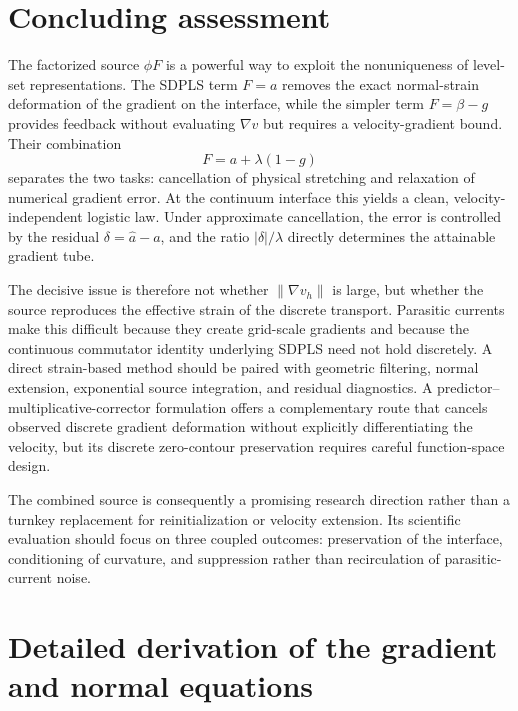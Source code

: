 \documentclass[11pt,a4paper]{article}
\theoremstyle{definition}
\theoremstyle{remark}
\newcommand{\norm}[1]{\left\lVert #1\right\rVert}
\newcommand{\abs}[1]{\left\lvert #1\right\rvert}
\begin{document}
\section{Concluding assessment}

The factorized source $\phi F$ is a powerful way to exploit the nonuniqueness of level-set representations. The SDPLS term $F=a$ removes the exact normal-strain deformation of the gradient on the interface, while the simpler term $F=\beta-g$ provides feedback without evaluating $\nabla v$ but requires a velocity-gradient bound. Their combination
\begin{equation}
  F=a+\lambda(1-g)
\end{equation}
separates the two tasks: cancellation of physical stretching and relaxation of numerical gradient error. At the continuum interface this yields a clean, velocity-independent logistic law. Under approximate cancellation, the error is controlled by the residual $\delta=\widehat a-a$, and the ratio $\abs\delta/\lambda$ directly determines the attainable gradient tube.

The decisive issue is therefore not whether $\norm{\nabla v_h}$ is large, but whether the source reproduces the effective strain of the discrete transport. Parasitic currents make this difficult because they create grid-scale gradients and because the continuous commutator identity underlying SDPLS need not hold discretely. A direct strain-based method should be paired with geometric filtering, normal extension, exponential source integration, and residual diagnostics. A predictor--multiplicative-corrector formulation offers a complementary route that cancels observed discrete gradient deformation without explicitly differentiating the velocity, but its discrete zero-contour preservation requires careful function-space design.

The combined source is consequently a promising research direction rather than a turnkey replacement for reinitialization or velocity extension. Its scientific evaluation should focus on three coupled outcomes: preservation of the interface, conditioning of curvature, and suppression rather than recirculation of parasitic-current noise.

\appendix

\section{Detailed derivation of the gradient and normal equations}
\end{document}
